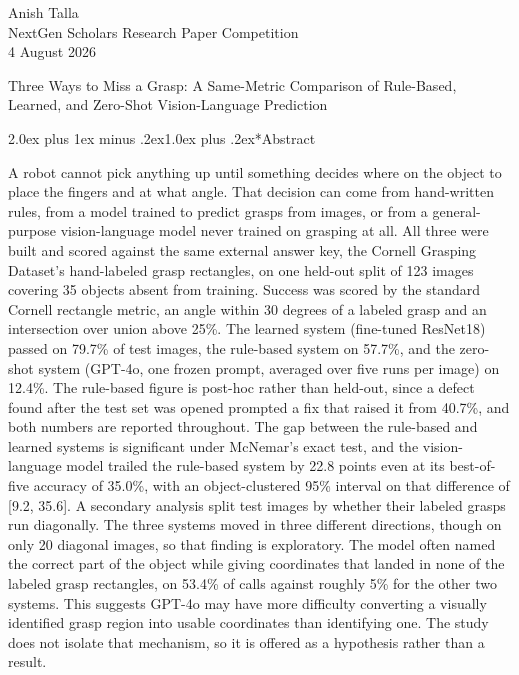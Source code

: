 \documentclass[12pt,letterpaper]{article}
\makeatletter
\renewcommand{\section}{\@startsection{section}{1}{0pt}%
  {2.0ex plus 1ex minus .2ex}{1.0ex plus .2ex}{\normalsize\bfseries}}
\makeatother
\begin{document}
\doublespacing

\begin{flushleft}
\setlength{\parindent}{0pt}
Anish Talla\\
NextGen Scholars Research Paper Competition\\
4 August 2026
\end{flushleft}

\begin{center}
Three Ways to Miss a Grasp: A Same-Metric Comparison of Rule-Based,
Learned, and Zero-Shot Vision-Language Prediction
\end{center}

\section*{Abstract}

A robot cannot pick anything up until something decides where on the
object to place the fingers and at what angle. That decision can come
from hand-written rules, from a model trained to predict grasps from
images, or from a general-purpose vision-language model never trained
on grasping at all. All three were built and scored against the same
external answer key, the Cornell Grasping Dataset's hand-labeled grasp
rectangles, on one held-out split of 123 images covering 35 objects
absent from training. Success was scored by the standard Cornell
rectangle metric, an angle within 30 degrees of a labeled grasp and an
intersection over union above 25\%. The learned system (fine-tuned
ResNet18) passed on 79.7\% of test images, the rule-based system on
57.7\%, and the zero-shot system (GPT-4o, one frozen prompt, averaged
over five runs per image) on 12.4\%. The rule-based figure is post-hoc
rather than held-out, since a defect found after the test set was
opened prompted a fix that raised it from 40.7\%, and both numbers are
reported throughout. The gap between the rule-based and learned systems
is significant under McNemar's exact test, and the vision-language
model trailed the rule-based system by 22.8 points even at its
best-of-five accuracy of 35.0\%, with an object-clustered 95\% interval
on that difference of [9.2, 35.6]. A secondary
analysis split test images by whether their labeled grasps run
diagonally. The three systems moved in three different directions,
though on only 20 diagonal images, so that finding is exploratory. The
model often named the correct part of the object while giving
coordinates that landed in none of the labeled grasp rectangles, on
53.4\% of calls against roughly 5\% for the other two systems. This
suggests GPT-4o may have more difficulty converting a visually
identified grasp region into usable coordinates than identifying one.
The study does not isolate that mechanism, so it is offered as a
hypothesis rather than a result.
\end{document}
